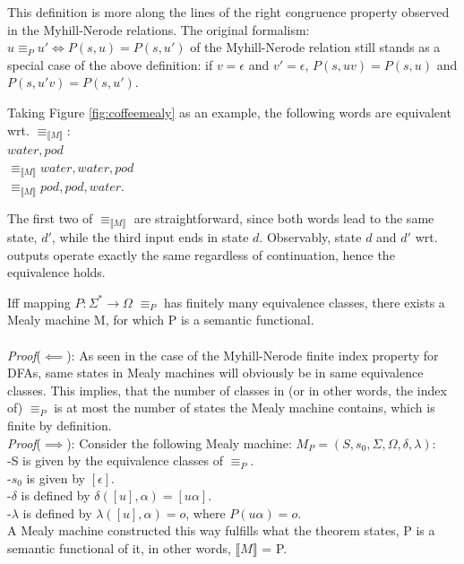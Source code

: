 This definition is more along the lines of the right congruence property observed in the Myhill-Nerode relations. The original formalism: $u \equiv_P u' \iff P(s, u) = P(s, u')$ of the Myhill-Nerode relation still stands as a special case of the above definition: if $v=\epsilon$ and $v'=\epsilon$, $P(s, uv) = P(s, u)$ and $P(s, u'v) = P(s, u')$.

\begin{example}
	Taking Figure \ref{fig:coffeemealy} as an example, the following words are equivalent wrt. $\equiv_{\llbracket M\rrbracket}$:\\
	\null\qquad\qquad\qquad\qquad\space $water, pod$\\
	\null\qquad\qquad$\equiv_{\llbracket M\rrbracket}$\qquad $water, water, pod$\\
	\null\qquad\qquad$\equiv_{\llbracket M\rrbracket}$\qquad $pod, pod, water$.
	
	The first two of $\equiv_{\llbracket M\rrbracket}$ are straightforward, since both words lead to the same state, $d'$, while the third input ends in state $d$. Observably, state $d$ and $d'$ wrt. outputs operate exactly the same regardless of continuation, hence the equivalence holds.
\end{example}

\begin{theorem}
	Iff mapping $P: \Sigma^*\to\Omega$ $\equiv_P$ has finitely many equivalence classes, there exists a Mealy machine M, for which P is a semantic functional.
	\\\\
	\textit{Proof}($\impliedby$): As seen in the case of the Myhill-Nerode finite index property for DFAs, same states in Mealy machines will obviously be in same equivalence classes. This implies, that the number of classes in (or in other words, the index of) $\equiv_P$ is at most the number of states the Mealy machine contains, which is finite by definition.
	\\
	\textit{Proof}($\implies$): Consider the following Mealy machine: $M_P=(S,s_{0},\Sigma,\Omega,\delta,\lambda)$:\\
	\null\qquad -S is given by the equivalence classes of $\equiv_P$.\\
	\null\qquad -$s_0$ is given by $[\epsilon]$.\\
	\null\qquad -$\delta$ is defined by $\delta([u], \alpha) = [u\alpha]$.\\
	\null\qquad -$\lambda$ is defined by $\lambda([u], \alpha) = o$, where $P(u\alpha) = o$.\\
	A Mealy machine constructed this way fulfills what the theorem states, P is a semantic functional of it, in other words, $\llbracket M\rrbracket$ = P.
\end{theorem}

